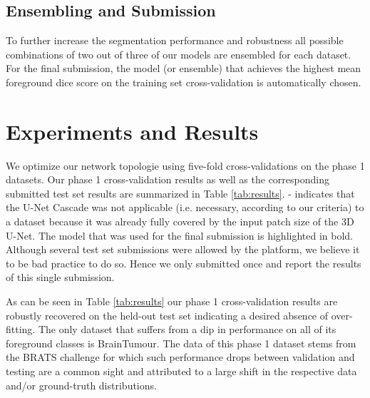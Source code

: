 \documentclass{templates/llncs} %
\begin{document}
    \subsection{Ensembling and Submission}
    To further increase the segmentation performance and robustness all possible combinations of two out of three of our models are ensembled for each dataset. For the final submission, the model (or ensemble) that achieves the highest mean foreground dice score on the training set cross-validation is automatically chosen.

\section{Experiments and Results}
    We optimize our network topologie using five-fold cross-validations on the phase 1 datasets. Our phase 1 cross-validation results as well as the corresponding submitted test set results are summarized in Table \ref{tab:results}. - indicates that the U-Net Cascade was not applicable (i.e. necessary, according to our criteria) to a dataset because it was already fully covered by the input patch size of the 3D U-Net. The model that was used for the final submission is highlighted in bold. Although several test set submissions were allowed by the platform, we believe it to be bad practice to do so. Hence we only submitted once and report the results of this single submission. 
    
    As can be seen in Table \ref{tab:results} our phase 1 cross-validation results are robustly recovered on the held-out test set indicating a desired absence of over-fitting. The only dataset that suffers from a dip in performance on all of its foreground classes is BrainTumour. The data of this phase 1 dataset stems from the BRATS challenge \cite{menze2015multimodal} for which such performance drops between validation and testing are a common sight and attributed to a large shift in the respective data and/or ground-truth distributions.
\end{document}
